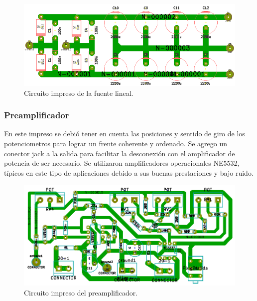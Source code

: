 \begin{figure}[H]
\centering
\centerline{\includegraphics[width=1\textwidth]{img/circuito_impreso_fuente_lineal.png}}
\caption{Circuito impreso de la fuente lineal.}
\label{circuito_impreso_fuente_lineal} 
\end{figure}
\medskip
\subsubsection{Preamplificador}

En este impreso se debió tener en cuenta las posiciones y sentido de giro de los potenciometros para lograr un frente coherente y ordenado. Se agrego un conector jack a la salida para facilitar la desconexión con el amplificador de potencia de ser necesario.
Se utilizaron amplificadores operacionales NE5532, típicos en este tipo de aplicaciones debido a sus buenas prestaciones y bajo ruido.

\begin{figure}[H]
\centering
\centerline{\includegraphics[width=1\textwidth]{img/pre_pcb.png}}
\caption{Circuito impreso del preamplificador.}
\label{pre_pcb} 
\end{figure}